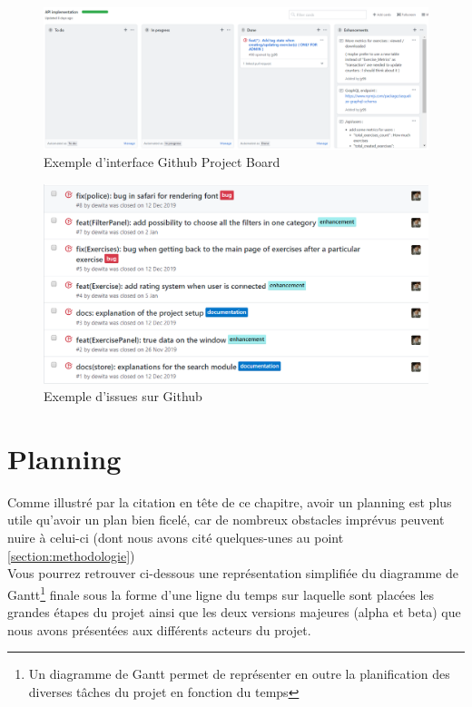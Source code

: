 \begin{figure}[H]
    \includegraphics[width=\textwidth,height=\textheight,keepaspectratio]{images/trelloLike.PNG}
    \centering
    \caption{Exemple d'interface Github Project Board}
    \label{pic:GithubBoard}
\end{figure}

\begin{figure}[H]
    \includegraphics[width=\textwidth,height=\textheight,keepaspectratio]{images/issueList.PNG}
    \centering
    \caption{Exemple d'issues sur Github}
    \label{pic:GithubIssues}
\end{figure}

\section{Planning}
Comme illustré par la citation en tête de ce chapitre, avoir un planning est plus utile qu'avoir un plan bien ficelé, car de nombreux obstacles imprévus peuvent nuire à celui-ci (dont nous avons cité quelques-unes au point  \ref{section:methodologie})\\

Vous pourrez retrouver ci-dessous une représentation simplifiée du diagramme de Gantt\footnote{Un diagramme de Gantt permet de représenter en outre la planification des diverses tâches du projet en fonction du temps } finale sous la forme d'une ligne du temps sur laquelle sont placées les grandes étapes du projet ainsi que les deux versions majeures (alpha et beta) que nous avons présentées aux différents acteurs du projet.\\

